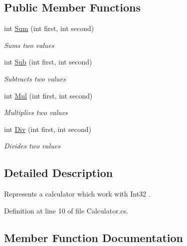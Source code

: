 \subsection*{Public Member Functions}
\begin{DoxyCompactItemize}
\item 
int \mbox{\hyperlink{class_test_project_1_1_task_library_1_1_tasks_1_1_lesson12_1_1_models_1_1_int_calculator_ad44fcda04ea65b03c16306d1a757d9aa}{Sum}} (int first, int second)
\begin{DoxyCompactList}\small\item\em Sums two values \end{DoxyCompactList}\item 
int \mbox{\hyperlink{class_test_project_1_1_task_library_1_1_tasks_1_1_lesson12_1_1_models_1_1_int_calculator_a69f5997d60be584f4fc118809b6efae6}{Sub}} (int first, int second)
\begin{DoxyCompactList}\small\item\em Subtracts two values \end{DoxyCompactList}\item 
int \mbox{\hyperlink{class_test_project_1_1_task_library_1_1_tasks_1_1_lesson12_1_1_models_1_1_int_calculator_a08161bda29271303d54e1d5265e751ed}{Mul}} (int first, int second)
\begin{DoxyCompactList}\small\item\em Multiplies two values \end{DoxyCompactList}\item 
int \mbox{\hyperlink{class_test_project_1_1_task_library_1_1_tasks_1_1_lesson12_1_1_models_1_1_int_calculator_a5c39b2ebcac3e814c2082f9e6e94ed78}{Div}} (int first, int second)
\begin{DoxyCompactList}\small\item\em Divides two values \end{DoxyCompactList}\end{DoxyCompactItemize}


\subsection{Detailed Description}
Represents a calculator which work with Int32 . 



Definition at line 10 of file Calculator.\+cs.



\subsection{Member Function Documentation}
\mbox{\label{class_test_project_1_1_task_library_1_1_tasks_1_1_lesson12_1_1_models_1_1_int_calculator_a5c39b2ebcac3e814c2082f9e6e94ed78}} 
